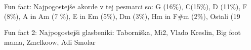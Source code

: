 \thispagestyle{empty}



	Fun fact:
	Najpogostejše akorde v tej pesmarci so:
	G (16\%), C(15\%), D (11\%), F (8\%), A in Am (7 \%), E in Em (5\%), Dm (3\%), Hm in F#m (2\%), Ostali (19%

	Fun fact 2:
	Najpogostejši glasbeniki: Taborniška, Mi2, Vlado Kreslin, Big foot mama, Zmelkoow, Adi Smolar

